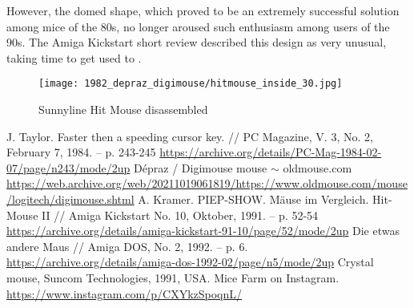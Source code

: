 \documentclass[11pt, a4paper]{article}
\begin{document}
However, the domed shape, which proved to be an extremely successful solution among mice of the 80s, no longer aroused such enthusiasm among users of the 90s. The Amiga Kickstart short review described this design as very unusual, taking time to get used to \cite{sunnyline}.

 \begin{figure}[h]
    \centering
    \texttt{[image: 1982\_depraz\_digimouse/hitmouse\_inside\_30.jpg]}
    \caption{Sunnyline Hit Mouse disassembled}
    \label{fig:HitMouseInside}
\end{figure}

\begin{thebibliography}{9}
 J. Taylor. Faster then a speeding cursor key. // PC Magazine, V. 3, No. 2, February 7, 1984. -- p. 243-245 \url{https://archive.org/details/PC-Mag-1984-02-07/page/n243/mode/2up}
 D\'epraz / Digimouse mouse $\sim$ oldmouse.com \url{https://web.archive.org/web/20211019061819/https://www.oldmouse.com/mouse/logitech/digimouse.shtml}
 A. Kramer. PIEP-SHOW. M\"ause im Vergleich. Hit-Mouse II // Amiga Kickstart No. 10, Oktober, 1991. -- p. 52-54 \url{https://archive.org/details/amiga-kickstart-91-10/page/52/mode/2up}
 Die etwas andere Maus // Amiga DOS, No. 2, 1992. -- p. 6. \url {https://archive.org/details/amiga-dos-1992-02/page/n5/mode/2up}
 Crystal mouse, Suncom Technologies, 1991, USA. Mice Farm on Instagram. \url{https://www.instagram.com/p/CXYkzSpoqnL/}
\end{thebibliography}
\end{document}
